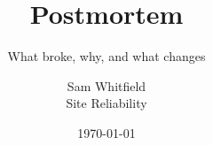 \documentclass[aspectratio=169,11pt]{beamer}
\title{Postmortem}
\subtitle{What broke, why, and what changes}
\author{Sam Whitfield \\ \small Site Reliability}
\date{\today}
\begin{document}
\titleslide





\end{document}
